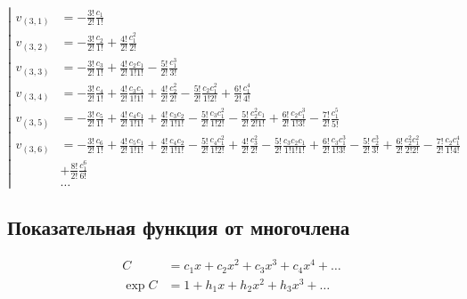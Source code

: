 \begin{equation*}
\left|
\begin{aligned}
v_{(3,1)} 
&= 
- \frac{3!}{2!} \frac{c_1}{1!} \\ 
v_{(3,2)} 
&= 
- \frac{3!}{2!} \frac{c_2}{1!} 
+ \frac{4!}{2!} \frac{c_1^2}{2!} \\
v_{(3,3)} 
&= 
- \frac{3!}{2!} \frac{c_3}{1!} 
+ \frac{4!}{2!} \frac{c_2 c_1}{1!1!} 
- \frac{5!}{2!} \frac{c_1^3}{3!} \\
v_{(3,4)}
&= 
- \frac{3!}{2!} \frac{c_4}{1!} 
+ \frac{4!}{2!} \frac{c_3 c_1}{1!1!} 
+ \frac{4!}{2!} \frac{c_2^2}{2!}
- \frac{5!}{2!} \frac{c_2 c_1^2}{1!2!}
+ \frac{6!}{2!} \frac{c_1^4}{4!} \\
v_{(3,5)}
&= 
- \frac{3!}{2!} \frac{c_5}{1!} 
+ \frac{4!}{2!} \frac{c_4 c_1}{1!1!} 
+ \frac{4!}{2!} \frac{c_3 c_2}{1!1!}
- \frac{5!}{2!} \frac{c_3 c_1^2}{1!2!}
- \frac{5!}{2!} \frac{c_2^2 c_1}{2!1!}
+ \frac{6!}{2!} \frac{c_2 c_1^3}{1!3!}
- \frac{7!}{2!} \frac{c_1^5}{5!} \\
v_{(3,6)}
&= 
- \frac{3!}{2!} \frac{c_6}{1!} 
+ \frac{4!}{2!} \frac{c_5 c_1}{1!1!} 
+ \frac{4!}{2!} \frac{c_4 c_2}{1!1!}
- \frac{5!}{2!} \frac{c_4 c_1^2}{1!2!}
+ \frac{4!}{2!} \frac{c_3^2}{2!}
- \frac{5!}{2!} \frac{c_3 c_2 c_1}{1!1!1!}
+ \frac{6!}{2!} \frac{c_3 c_1^3}{1!3!}
- \frac{5!}{2!} \frac{c_2^3}{3!}
+ \frac{6!}{2!} \frac{c_2^2 c_1^2}{2!2!}
- \frac{7!}{2!} \frac{c_2 c_1^4}{1!4!} \\
&
+ \frac{8!}{2!} \frac{c_1^6}{6!} \\
&\ldots
\end{aligned}
\right.
\end{equation*}

\subsection{Показательная функция от многочлена}

\begin{equation*}
\begin{aligned}
C &= c_1 x + c_2 x^2 + c_3 x^3 + c_4 x^4 + \ldots \\
\exp{C} &= 1 + h_1 x + h_2 x^2 + h_3 x^3 + \ldots \\
\end{aligned}
\end{equation*}

